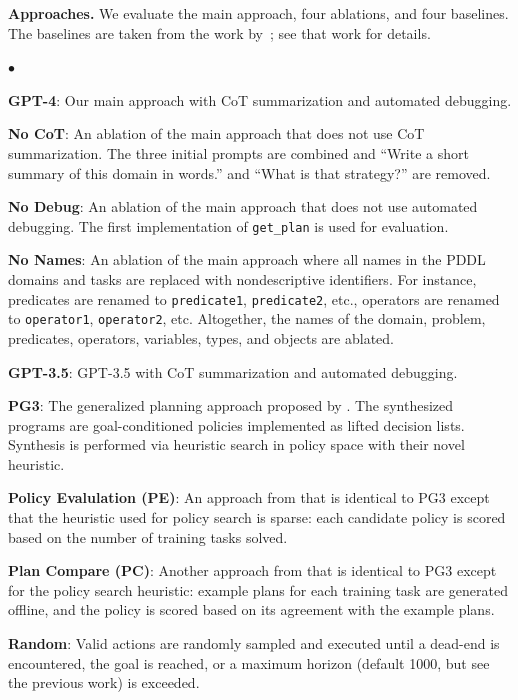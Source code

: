 \documentclass[letterpaper]{article} %
\newenvironment{tightlist}%
{\begin{list}{$\bullet$}{%
\setlength{\topsep}{0in}
\setlength{\partopsep}{0in}
\setlength{\itemsep}{0in}
\setlength{\parsep}{0in}
\setlength{\leftmargin}{1.5em}
\setlength{\rightmargin}{0in}
}
}%
{\end{list}
}
\begin{document}
\textbf{Approaches.}
We evaluate the main approach, four ablations, and four baselines.
The baselines are taken from the work by~\citet{yang2022pg3}; see that work for details.

\begin{tightlist}
\item \textbf{GPT-4}: Our main approach with CoT summarization and automated debugging.
\item \textbf{No CoT}: An ablation of the main approach that does not use CoT summarization. The three initial prompts are combined and ``Write a short summary of this domain in words.'' and ``What is that strategy?'' are removed.
\item \textbf{No Debug}: An ablation of the main approach that does not use automated debugging. The first implementation of \texttt{get\_plan} is used for evaluation.
\item \textbf{No Names}: An ablation of the main approach where all names in the PDDL domains and tasks are replaced with nondescriptive identifiers. For instance, predicates are renamed to \texttt{predicate1}, \texttt{predicate2}, etc., operators are renamed to \texttt{operator1}, \texttt{operator2}, etc. Altogether, the names of the domain, problem, predicates, operators, variables, types, and objects are ablated.
\item \textbf{GPT-3.5}: GPT-3.5 with CoT summarization and automated debugging.
\item \textbf{PG3}: The generalized planning approach proposed by \citet{yang2022pg3}. The synthesized programs are goal-conditioned policies implemented as lifted decision lists. Synthesis is performed via heuristic search in policy space with their novel heuristic.
\item \textbf{Policy Evalulation (PE)}: An approach from \citet{yang2022pg3} that is identical to PG3 except that the heuristic used for policy search is sparse: each candidate policy is scored based on the number of training tasks solved.
\item \textbf{Plan Compare (PC)}: Another approach from \citet{yang2022pg3} that is identical to PG3 except for the policy search heuristic: example plans for each training task are generated offline, and the policy is scored based on its agreement with the example plans.
\item \textbf{Random}: Valid actions are randomly sampled and executed until a dead-end is encountered, the goal is reached, or a maximum horizon (default 1000, but see the previous work) is exceeded.
\end{tightlist}
\end{document}
